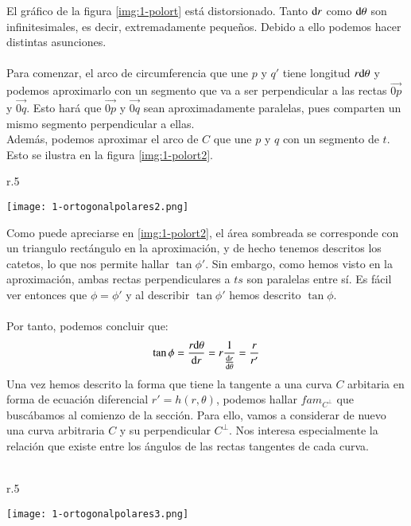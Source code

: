 El gráfico de la figura \ref{img:1-polort} está distorsionado. Tanto $\mathrm{d} r$ como $\mathrm{d} \theta$ son infinitesimales, es decir, extremadamente pequeños. Debido a ello podemos hacer distintas asunciones.\\\\
Para comenzar, el arco de circumferencia que une $p$ y $q'$ tiene longitud $r\mathrm{d} \theta$ y podemos aproximarlo con un segmento que va a ser perpendicular a las rectas $\vec{0p}$ y $\vec{0q}$. Esto hará que $\vec{0p}$ y $\vec{0q}$ sean aproximadamente paralelas, pues comparten un mismo segmento perpendicular a ellas.\\ Además, podemos aproximar el arco de $C$ que une $p$ y $q$ con un segmento de $t$. Esto se ilustra en la figura \ref{img:1-polort2}.

\begin{wrapfigure}{r}{.5\textwidth}
  \begin{center}
    \texttt{[image: 1-ortogonalpolares2.png]}
  \end{center}
  \caption{Aproximación por infinitesimales}\label{img:1-polort2}
\end{wrapfigure}

Como puede apreciarse en \ref{img:1-polort2}, el área sombreada se corresponde con un triangulo rectángulo en la aproximación, y de hecho tenemos descritos los catetos, lo que nos permite hallar $\tan\phi'$. Sin embargo, como hemos visto en la aproximación, ambas rectas perpendiculares a $ts$ son paralelas entre sí. Es fácil ver entonces que $\phi = \phi'$ y al describir $\tan\phi'$ hemos descrito $\tan\phi$.\\\\
Por tanto, podemos concluir que:
$$
\tan\phi = \frac{r\mathrm{d} \theta}{\mathrm{d} r} = r \frac{1}{\frac{\mathrm{d}r}{\mathrm{d}\theta}} = \frac{r}{r'}
$$
Una vez hemos descrito la forma que tiene la tangente a una curva $C$ arbitaria en forma de ecuación diferencial $r' = h(r,\theta)$, podemos hallar $fam_{C^\perp}$ que buscábamos al comienzo de la sección. Para ello, vamos a considerar de nuevo una curva arbitraria $C$ y su perpendicular $C^\perp$. Nos interesa especialmente la relación que existe entre los ángulos de las rectas tangentes de cada curva.\\\\
\begin{wrapfigure}{r}{.5\textwidth}
  \begin{center}
    \texttt{[image: 1-ortogonalpolares3.png]}
  \end{center}
  \caption{Angulos entre curvas ortogonales}\label{img:1-polort3}
\end{wrapfigure}

